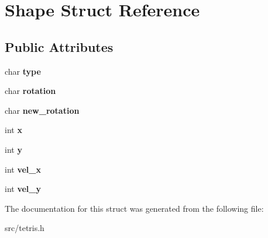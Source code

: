 \hypertarget{structShape}{}\section{Shape Struct Reference}
\label{structShape}
\subsection*{Public Attributes}
\begin{DoxyCompactItemize}
\item 
\mbox{\label{structShape_aed77081361ea30eabbf426f86eeebc71}} 
char {\bfseries type}
\item 
\mbox{\label{structShape_a3703115c8f437936d629955b0c221aa8}} 
char {\bfseries rotation}
\item 
\mbox{\label{structShape_a683f5a7de412a8768cff238c5b8d2c3f}} 
char {\bfseries new\+\_\+rotation}
\item 
\mbox{\label{structShape_ac1bbc96c15ee1218a5bfc38cde1014fa}} 
int {\bfseries x}
\item 
\mbox{\label{structShape_a1c8aa4f016736974cd3ab791ce143639}} 
int {\bfseries y}
\item 
\mbox{\label{structShape_ab6d63ae4c537c6acfd3bfe06fdc8b2a5}} 
int {\bfseries vel\+\_\+x}
\item 
\mbox{\label{structShape_a76c74b60bbd98e521a22b96e10ec2f33}} 
int {\bfseries vel\+\_\+y}
\end{DoxyCompactItemize}


The documentation for this struct was generated from the following file\+:\begin{DoxyCompactItemize}
\item 
src/tetris.\+h\end{DoxyCompactItemize}
